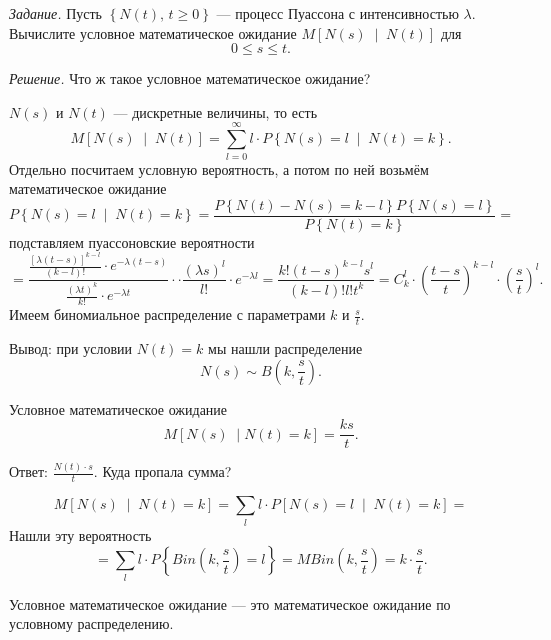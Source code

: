 \textit{Задание.}
Пусть $ \left\{ N \left( t \right), \, t \geq 0 \right\} $ ---
процесс Пуассона с интенсивностью $ \lambda $.
Вычислите условное математическое ожидание
$M \left[ N \left( s \right) \; \middle| \; N \left( t \right) \right] $ для
$$0 \leq s \leq t.$$

\textit{Решение.}
Что ж такое условное математическое ожидание?

$N \left( s \right) $ и $N \left( t \right) $ --- дискретные величины, то есть
$$M \left[ N \left( s \right) \; \middle| \; N \left( t \right) \right] =
  \sum \limits_{l = 0}^{ \infty }
    l \cdot P \left\{ N \left( s \right) = l \; \middle| \; N \left( t \right) = k \right\}.$$
Отдельно посчитаем условную вероятность, а потом по ней возьмём математическое ожидание
$$P \left\{ N \left( s \right) = l \; \middle| \; N \left( t \right) = k \right\} =
  \frac{P \left\{ N \left( t \right) - N \left( s \right) = k - l \right\} P \left\{ N \left( s \right) = l \right\} }{P \left\{ N \left( t \right) = k \right\} } =$$
подставляем пуассоновские вероятности
$$= \frac{ \frac{ \left[ \lambda \left( t - s \right) \right]^{k - l}}{ \left( k - l \right)!} \cdot e^{-\lambda \left( t - s \right) }}{ \frac{ \left( \lambda t \right)^k}{k!} \cdot e^{-\lambda t}} \cdot
  \cdot \frac{ \left( \lambda s \right)^l}{l!} \cdot e^{-\lambda l} =
  \frac{k! \left( t - s \right)^{k - l} s^l}{ \left( k - l \right)! l! t^k} =
  C_k^l \cdot \left( \frac{t - s}{t} \right)^{k - l} \cdot \left( \frac{s}{t} \right)^l.$$
Имеем биномиальное распределение с параметрами $k$ и $ \frac{s}{t}$.

Вывод: при условии $N \left( t \right) = k$ мы нашли распределение
$$N \left( s \right) \sim
  B \left( k, \frac{s}{t} \right).$$

Условное математическое ожидание
$$M \left[ N \left( s \right) \; \middle| N \left( t \right) = k \right] =
  \frac{ks}{t}.$$

Ответ: $ \frac{N \left( t \right) \cdot s}{t}$.
Куда пропала сумма?

$$M \left[ N \left( s \right) \; \middle| \; N \left( t \right) = k \right] =
  \sum \limits_l
    l \cdot P \left[ N \left( s \right) = l \; \middle| \; N \left( t \right) = k \right] =$$
Нашли эту вероятность
$$= \sum \limits_l l \cdot P \left\{ Bin \left( k, \frac{s}{t} \right) = l \right\} =
MBin \left( k, \frac{s}{t} \right) =
k \cdot \frac{s}{t}.$$

Условное математическое ожидание --- это математическое ожидание по условному распределению.

